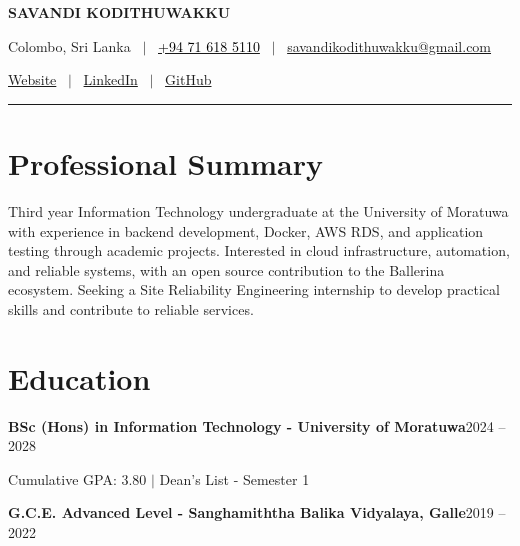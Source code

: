 \documentclass[10pt,a4paper]{article}
\newcommand{\titledate}[2]{%
    \noindent\textbf{#1}\hfill #2\par
}
\begin{document}
\begin{center}

    {\bfseries\fontsize{21}{23}\selectfont
    SAVANDI KODITHUWAKKU}

    \vspace{3pt}

    Colombo, Sri Lanka
    \ $|$ \
    \href{tel:+94716185110}
    {\textcolor{black}{+94 71 618 5110}}
    \ $|$ \
    \href{mailto:savandikodithuwakku@gmail.com}
    {savandikodithuwakku@gmail.com}

    \vspace{2pt}

    \href{https://savandi.vercel.app/}{Website}
    \ $|$ \
    \href{https://www.linkedin.com/in/savandi-kodithuwakku/}{LinkedIn}
    \ $|$ \
    \href{https://github.com/savandikodithuwakku}{GitHub}

\end{center}

\vspace{-6pt}
\rule{\linewidth}{0.8pt}

\section{Professional Summary}

Third year Information Technology undergraduate at the University of
Moratuwa with experience in backend development, Docker, AWS RDS, and
application testing through academic projects. Interested in cloud
infrastructure, automation, and reliable systems, with an open source
contribution to the Ballerina ecosystem. Seeking a Site Reliability
Engineering internship to develop practical skills and contribute to
reliable services.

\section{Education}

\titledate
    {BSc (Hons) in Information Technology - University of Moratuwa}
    {2024 -- 2028}

Cumulative GPA: 3.80 \quad $|$ \quad Dean's List - Semester 1

\vspace{3pt}

\titledate
    {G.C.E. Advanced Level - Sanghamiththa Balika Vidyalaya, Galle}
    {2019 -- 2022}
\end{document}
